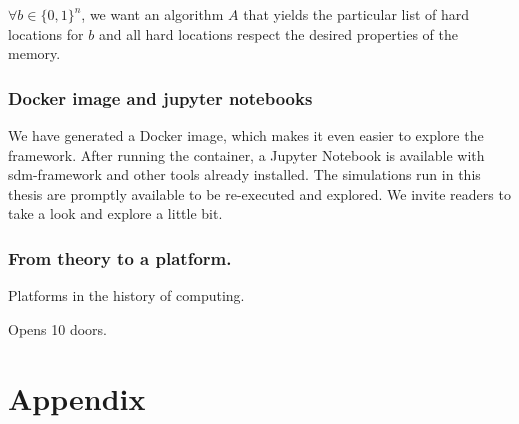 $\forall b \in \{ 0,1\} ^n$, we want an algorithm $A$ that yields the particular list of hard locations for $b$ and all hard locations respect the desired properties of the memory.







\subsection{Docker image and jupyter notebooks}

We have generated a Docker image, which makes it even easier to explore the framework. After running the container, a Jupyter Notebook is available with sdm-framework and other tools already installed. The simulations run in this thesis are promptly available to be re-executed and explored. We invite readers to take a look and explore a little bit.

\subsection{From theory to a platform.}


Platforms in the history of computing.


Opens 10 doors.



\chapter{Appendix}

%
